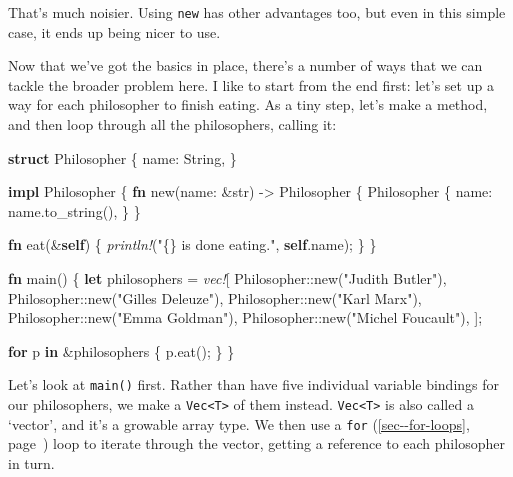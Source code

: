 \documentclass[a4paper,]{book}
\renewcommand*{\hyperref}[2][\ar]{%
  \def\ar{#2}%
  #2 (\autoref{#1}, page~\pageref{#1})}
\newenvironment{Shaded}{\begin{snugshade}}{\end{snugshade}}
\newcommand{\KeywordTok}[1]{\textcolor[rgb]{0.13,0.29,0.53}{\textbf{{#1}}}}
\newcommand{\DataTypeTok}[1]{\textcolor[rgb]{0.13,0.29,0.53}{{#1}}}
\newcommand{\StringTok}[1]{\textcolor[rgb]{0.31,0.60,0.02}{{#1}}}
\newcommand{\PreprocessorTok}[1]{\textcolor[rgb]{0.56,0.35,0.01}{\textit{{#1}}}}
\newcommand{\NormalTok}[1]{{#1}}
\begin{document}
That's much noisier. Using \texttt{new} has other advantages too, but
even in this simple case, it ends up being nicer to use.

Now that we've got the basics in place, there's a number of ways that we
can tackle the broader problem here. I like to start from the end first:
let's set up a way for each philosopher to finish eating. As a tiny
step, let's make a method, and then loop through all the philosophers,
calling it:

\begin{Shaded}
\begin{Highlighting}[]
\KeywordTok{struct} \NormalTok{Philosopher \{}
    \NormalTok{name: }\DataTypeTok{String}\NormalTok{,}
\NormalTok{\}}

\KeywordTok{impl} \NormalTok{Philosopher \{}
    \KeywordTok{fn} \NormalTok{new(name: &}\DataTypeTok{str}\NormalTok{) -> Philosopher \{}
        \NormalTok{Philosopher \{}
            \NormalTok{name: name.to_string(),}
        \NormalTok{\}}
    \NormalTok{\}}

    \KeywordTok{fn} \NormalTok{eat(&}\KeywordTok{self}\NormalTok{) \{}
        \PreprocessorTok{println!}\NormalTok{(}\StringTok{"\{\} is done eating."}\NormalTok{, }\KeywordTok{self}\NormalTok{.name);}
    \NormalTok{\}}
\NormalTok{\}}

\KeywordTok{fn} \NormalTok{main() \{}
    \KeywordTok{let} \NormalTok{philosophers = }\PreprocessorTok{vec!}\NormalTok{[}
        \NormalTok{Philosopher::new(}\StringTok{"Judith Butler"}\NormalTok{),}
        \NormalTok{Philosopher::new(}\StringTok{"Gilles Deleuze"}\NormalTok{),}
        \NormalTok{Philosopher::new(}\StringTok{"Karl Marx"}\NormalTok{),}
        \NormalTok{Philosopher::new(}\StringTok{"Emma Goldman"}\NormalTok{),}
        \NormalTok{Philosopher::new(}\StringTok{"Michel Foucault"}\NormalTok{),}
    \NormalTok{];}

    \KeywordTok{for} \NormalTok{p }\KeywordTok{in} \NormalTok{&philosophers \{}
        \NormalTok{p.eat();}
    \NormalTok{\}}
\NormalTok{\}}
\end{Highlighting}
\end{Shaded}

Let's look at \texttt{main()} first. Rather than have five individual
variable bindings for our philosophers, we make a
\texttt{Vec\textless{}T\textgreater{}} of them instead.
\texttt{Vec\textless{}T\textgreater{}} is also called a `vector', and
it's a growable array type. We then use a
\hyperref[sec--for-loops]{\texttt{for}} loop to iterate through the
vector, getting a reference to each philosopher in turn.
\end{document}
